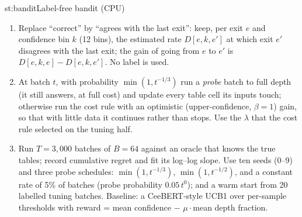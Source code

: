 \begin{step}{st:bandit}{Label-free bandit (CPU)}
\begin{enumerate}
  \item Replace ``correct'' by ``agrees with the last exit'': keep, per exit $e$ and confidence bin $k$ (12 bins),
  the estimated rate $D[e,k,e']$ at which exit $e'$ disagrees with the last exit; the gain of going from $e$ to $e'$
  is $D[e,k,e]-D[e,k,e']$. No label is used.
  \item At batch $t$, with probability $\min(1, t^{-1/3})$ run a \emph{probe} batch to full depth (it still answers,
  at full cost) and update every table cell its inputs touch; otherwise run the cost rule with an optimistic
  (upper-confidence, $\beta=1$) gain, so that with little data it continues rather than stops. Use the $\lambda$ that
  the cost rule selected on the tuning half.
  \item Run $T=3{,}000$ batches of $B=64$ against an oracle that knows the true tables; record cumulative regret and
  fit its log--log slope. Use ten seeds (0--9) and three probe schedules: $\min(1,t^{-1/3})$, $\min(1,t^{-1/2})$, and a constant rate
  of 5\% of batches (probe probability $0.05\,t^{0}$); and a warm start
  from 20 labelled tuning batches. Baseline: a CeeBERT-style UCB1 over per-sample thresholds with reward = mean
  confidence $-$ $\mu\cdot$mean depth fraction.
\end{enumerate}
\end{step}

